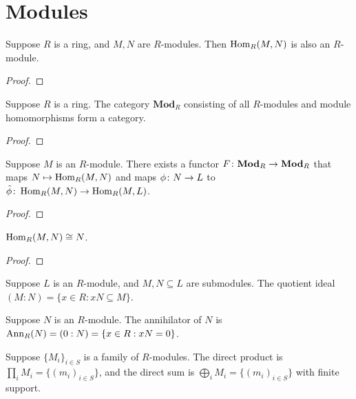 \section{Modules}

\begin{proposition}
    Suppose \(R\) is a ring, and \(M,N\) are \(R\)-modules.
    Then \(\operatorname{Hom}_R(M,N)\) is also an \(R\)-module.
\end{proposition}
\begin{proof}
    
\end{proof}

\begin{proposition}
    Suppose \(R\) is a ring.
    The category \(\textbf{Mod}_R\) consisting of all \(R\)-modules
    and module homomorphisms form a category.
\end{proposition}
\begin{proof}
    
\end{proof}

\begin{proposition}
    Suppose \(M\) is an \(R\)-module.
    There exists a functor \(F\colon\textbf{Mod}_R\to\textbf{Mod}_R\)
    that maps \(N \mapsto \operatorname{Hom}_R(M,N)\)
    and maps \(\phi\colon N\to L\) to \(\tilde{\phi}\colon\operatorname{Hom}_R(M,N)\to\operatorname{Hom}_R(M,L)\).
\end{proposition}
\begin{proof}
    
\end{proof}
\begin{corollary}
    \(\operatorname{Hom}_R(M,N) \cong N\).
\end{corollary}
\begin{proof}
    
\end{proof}

\begin{definition}
    Suppose \(L\) is an \(R\)-module,
    and \(M,N \subseteq L\) are submodules.
    The quotient ideal \((M:N) = \{x \in R : xN \subseteq M\}\).
\end{definition}
\begin{definition}
    Suppose \(N\) is an \(R\)-module.
    The annihilator of \(N\) is \(\operatorname{Ann}_R(N) = (0:N) = \{x \in R : xN = 0\}\).
\end{definition}

\begin{definition}
    Suppose \({\{M_i\}}_{i \in S}\) is a family of \(R\)-modules.
    The direct product is \(\prod_i M_i = \{{(m_i)}_{i \in S}\}\),
    and the direct sum is \(\bigoplus_i M_i = \{{(m_i)_{i \in S}}\}\) with finite support.
\end{definition}

